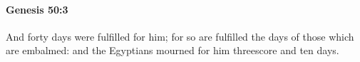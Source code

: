 
		\paragraph{Genesis 50:3} %
			\label{GENESIS-50-3}

			And forty days were fulfilled for him; for so are fulfilled the days of those which are embalmed: and the Egyptians mourned for him threescore and ten days.


